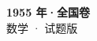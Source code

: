 \documentclass[zihao=-4, a4paper]{ctexart}
\begin{document}
\begin{center}
  {\Large\bfseries 1955 年·全国卷}\\[4pt]
  {\large 数学 · 试题版}
\end{center}
\medskip
{}

\end{document}
